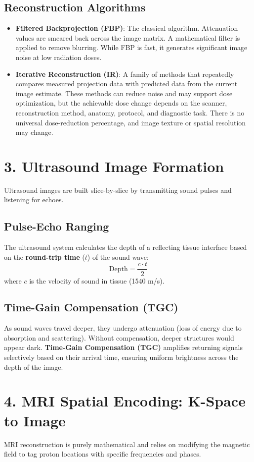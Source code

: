 \subsection*{Reconstruction Algorithms}
\begin{itemize}
    \item \textbf{Filtered Backprojection (FBP)}: The classical algorithm. Attenuation values are smeared back across the image matrix. A mathematical filter is applied to remove blurring. While FBP is fast, it generates significant image noise at low radiation doses.
    \item \textbf{Iterative Reconstruction (IR)}: A family of methods that repeatedly compares measured projection data with predicted data from the current image estimate. These methods can reduce noise and may support dose optimization, but the achievable dose change depends on the scanner, reconstruction method, anatomy, protocol, and diagnostic task. There is no universal dose-reduction percentage, and image texture or spatial resolution may change.
\end{itemize}


\section*{3. Ultrasound Image Formation}
Ultrasound images are built slice-by-slice by transmitting sound pulses and listening for echoes.

\subsection*{Pulse-Echo Ranging}
The ultrasound system calculates the depth of a reflecting tissue interface based on the \textbf{round-trip time} ($t$) of the sound wave:
$$\text{Depth} = \frac{c \cdot t}{2}$$
where $c$ is the velocity of sound in tissue (1540 m/s). 

\subsection*{Time-Gain Compensation (TGC)}
As sound waves travel deeper, they undergo attenuation (loss of energy due to absorption and scattering). Without compensation, deeper structures would appear dark. \textbf{Time-Gain Compensation (TGC)} amplifies returning signals selectively based on their arrival time, ensuring uniform brightness across the depth of the image.


\section*{4. MRI Spatial Encoding: K-Space to Image}
MRI reconstruction is purely mathematical and relies on modifying the magnetic field to tag proton locations with specific frequencies and phases.

